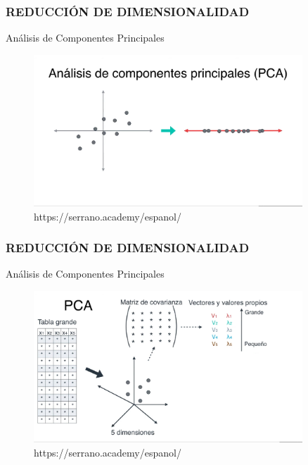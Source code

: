 \documentclass{beamer}
\begin{document}
\begin{frame}
	\frametitle{REDUCCIÓN DE DIMENSIONALIDAD}
	\begin{block}{Análisis de Componentes Principales}	
		\begin{figure}
			\includegraphics[width=0.9\textwidth]{PCA/IMG_3589.jpg}
			\caption{https://serrano.academy/espanol/}
		\end{figure}
	\end{block}
\end{frame}

\begin{frame}
	\frametitle{REDUCCIÓN DE DIMENSIONALIDAD}
	\begin{block}{Análisis de Componentes Principales}	
		\begin{figure}
			\includegraphics[width=0.9\textwidth]{PCA/IMG_3590.jpg}
			\caption{https://serrano.academy/espanol/}
		\end{figure}
	\end{block}
\end{frame}
\end{document}
